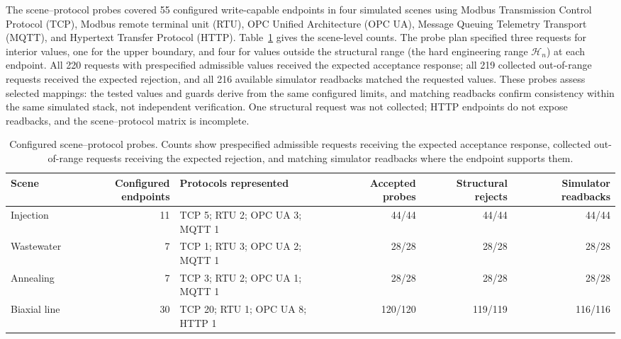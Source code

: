 The scene--protocol probes covered 55 configured write-capable endpoints in four simulated scenes using Modbus Transmission Control Protocol (TCP), Modbus remote terminal unit (RTU), OPC Unified Architecture (OPC UA), Message Queuing Telemetry Transport (MQTT), and Hypertext Transfer Protocol (HTTP). Table~\ref{tab:scene-probe-results} gives the scene-level counts. The probe plan specified three requests for interior values, one for the upper boundary, and four for values outside the structural range (the hard engineering range $\mathcal{H}_n$) at each endpoint. All 220 requests with prespecified admissible values received the expected acceptance response; all 219 collected out-of-range requests received the expected rejection, and all 216 available simulator readbacks matched the requested values. These probes assess selected mappings: the tested values and guards derive from the same configured limits, and matching readbacks confirm consistency within the same simulated stack, not independent verification. One structural request was not collected; HTTP endpoints do not expose readbacks, and the scene--protocol matrix is incomplete.

\begin{table}[!t]
\centering
\caption{Configured scene--protocol probes. Counts show prespecified admissible requests receiving the expected acceptance response, collected out-of-range requests receiving the expected rejection, and matching simulator readbacks where the endpoint supports them.}
\label{tab:scene-probe-results}
\footnotesize
\setlength{\tabcolsep}{3pt}
\begin{tabularx}{\textwidth}{@{}>{\raggedright\arraybackslash}p{1.55cm}r X r r r@{}}
\toprule
Scene & Configured endpoints & Protocols represented & Accepted probes & Structural rejects & Simulator readbacks \\
\midrule
Injection & 11 & TCP 5; RTU 2; OPC UA 3; MQTT 1 & 44/44 & 44/44 & 44/44 \\
Wastewater & 7 & TCP 1; RTU 3; OPC UA 2; MQTT 1 & 28/28 & 28/28 & 28/28 \\
Annealing & 7 & TCP 3; RTU 2; OPC UA 1; MQTT 1 & 28/28 & 28/28 & 28/28 \\
Biaxial line & 30 & TCP 20; RTU 1; OPC UA 8; HTTP 1 & 120/120 & 119/119 & 116/116 \\
\bottomrule
\end{tabularx}
\end{table}

